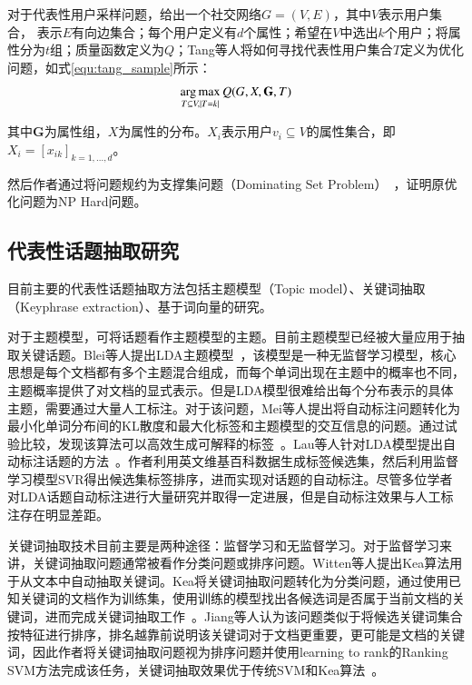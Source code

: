 对于代表性用户采样问题，给出一个社交网络$G=(V,E)$，其中$V$表示用户集合， 表示$E$有向边集合；每个用户定义有$d$个属性；希望在$V$中选出$k$个用户；将属性分为$t$组；质量函数定义为$Q$；Tang等人将如何寻找代表性用户集合$T$定义为优化问题，如式\ref{equ:tang_sample}所示：
\begin{equation}
\label{equ:tang_sample}
\setlength{\abovedisplayskip}{10pt}
\setlength{\belowdisplayskip}{10pt}
\mathop{\arg \max}_{T\subseteq V,|T=k|}{Q(G,X,\textbf{G},T)}
\end{equation}

其中$\textbf{G}$为属性组，$X$为属性的分布。$X_i$表示用户$v_i\subseteq V$的属性集合，即$X_i=[x_{ik}]_{k=1,...,d}$。

然后作者通过将问题规约为支撑集问题（Dominating Set Problem）~，证明原优化问题为NP Hard问题。

\subsection{代表性话题抽取研究}

目前主要的代表性话题抽取方法包括主题模型（Topic model）、关键词抽取（Keyphrase extraction）、基于词向量的研究。

对于主题模型，可将话题看作主题模型的主题。目前主题模型已经被大量应用于抽取关键话题。Blei等人提出LDA主题模型~，该模型是一种无监督学习模型，核心思想是每个文档都有多个主题混合组成，而每个单词出现在主题中的概率也不同，主题概率提供了对文档的显式表示。但是LDA模型很难给出每个分布表示的具体主题，需要通过大量人工标注。对于该问题，Mei等人提出将自动标注问题转化为最小化单词分布间的KL散度和最大化标签和主题模型的交互信息的问题。通过试验比较，发现该算法可以高效生成可解释的标签~。Lau等人针对LDA模型提出自动标注话题的方法~。作者利用英文维基百科数据生成标签候选集，然后利用监督学习模型SVR得出候选集标签排序，进而实现对话题的自动标注。尽管多位学者对LDA话题自动标注进行大量研究并取得一定进展，但是自动标注效果与人工标注存在明显差距。

关键词抽取技术目前主要是两种途径：监督学习和无监督学习。对于监督学习来讲，关键词抽取问题通常被看作分类问题或排序问题。Witten等人提出Kea算法用于从文本中自动抽取关键词。Kea将关键词抽取问题转化为分类问题，通过使用已知关键词的文档作为训练集，使用训练的模型找出各候选词是否属于当前文档的关键词，进而完成关键词抽取工作~。Jiang等人认为该问题类似于将候选关键词集合按特征进行排序，排名越靠前说明该关键词对于文档更重要，更可能是文档的关键词，因此作者将关键词抽取问题视为排序问题并使用learning to rank的Ranking SVM方法完成该任务，关键词抽取效果优于传统SVM和Kea算法~。

